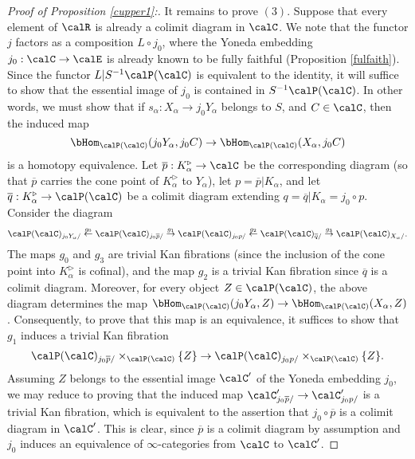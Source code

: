 \begin{proof}[Proof of Proposition \ref{cupper1}:]
It remains to prove $(3)$. Suppose that every element of $\calR$ is already a colimit diagram in $\calC$. 
We note that the functor $j$ factors as a composition $L \circ j_0$, where the Yoneda embedding $j_0: \calC \rightarrow \calE$ is already known to be fully faithful (Proposition \ref{fulfaith}).
Since the functor $L | S^{-1} \calP(\calC)$ is equivalent to the identity, it will suffice to show that
the essential image of $j_0$ is contained in $S^{-1} \calP(\calC)$. In other words, we must show that
if $s_{\alpha}: X_{\alpha} \rightarrow j_0 Y_{\alpha}$ belongs to $S$, and $C \in \calC$, then the induced map
$$ \bHom_{\calP(\calC)}( j_0 Y_{\alpha}, j_0 C) \rightarrow \bHom_{ \calP(\calC)}( X_{\alpha}, j_0 C)$$
is a homotopy equivalence. Let $\overline{p}: K^{\triangleright}_{\alpha} \rightarrow \calC$
be the corresponding diagram (so that $\overline{p}$ carries the cone point of
$K^{\triangleright}_{\alpha}$ to $Y_{\alpha}$), let $p = \overline{p} | K_{\alpha}$, and let
$\overline{q}: K^{\triangleright}_{\alpha} \rightarrow \calP(\calC)$ be a colimit diagram
extending $q = \overline{q} | K_{\alpha} = j_0 \circ p$. Consider the diagram
$$ \calP(\calC)_{ j_0 Y_{\alpha}/ } \stackrel{g_0}{\leftarrow} \calP(\calC)_{ j_0 \overline{p}/
} \stackrel{g_1}{\rightarrow} \calP(\calC)_{ j_0 p/ } \stackrel{g_2}{\leftarrow} \calP(\calC)_{ \overline{q}/} \stackrel{g_3}{\rightarrow} \calP(\calC)_{X_{\alpha}/ }.$$
The maps $g_0$ and $g_3$ are trivial Kan fibrations (since the inclusion of the cone point into
$K^{\triangleright}_{\alpha}$ is cofinal), and the map $g_2$ is a trivial Kan fibration since
$\overline{q}$ is a colimit diagram. Moreover, for every object $Z \in \calP(\calC)$, the above diagram determines the map $\bHom_{ \calP(\calC)}( j_0 Y_{\alpha}, Z) \rightarrow \bHom_{ \calP(\calC)}( X_{\alpha}, Z)$. Consequently, to prove that this map is an equivalence, it suffices to show that $g_1$
induces a trivial Kan fibration
$$ \calP(\calC)_{ j_0 \overline{p}/ } \times_{ \calP(\calC) } \{ Z \} 
\rightarrow \calP(\calC)_{ j_0 p/} \times_{ \calP(\calC) } \{Z \}.$$ 
Assuming $Z$ belongs to the essential image $\calC'$ of the Yoneda embedding $j_0$, we may
reduce to proving that the induced map
$ \calC'_{ j_0 \overline{p}/ } \rightarrow \calC'_{ j_0 p/}$ is a trivial Kan fibration, which is equivalent to the assertion that $j_0 \circ \overline{p}$ is a colimit diagram in $\calC'$. This is clear, since
$\overline{p}$ is a colimit diagram by assumption and $j_0$ induces an equivalence of
$\infty$-categories from $\calC$ to $\calC'$.
\end{proof}

